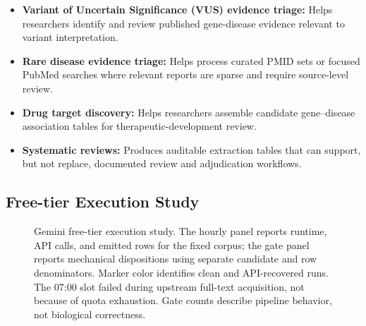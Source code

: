 \begin{itemize}[itemsep=2pt]
    \item \textbf{Variant of Uncertain Significance (VUS) evidence triage:} Helps researchers identify and review published gene-disease evidence relevant to variant interpretation.
    \item \textbf{Rare disease evidence triage:} Helps process curated PMID sets or focused PubMed searches where relevant reports are sparse and require source-level review.
    \item \textbf{Drug target discovery:} Helps researchers assemble candidate gene--disease association tables for therapeutic-development review.
    \item \textbf{Systematic reviews:} Produces auditable extraction tables that can support, but not replace, documented review and adjudication workflows.
\end{itemize}

\subsection{Free-tier Execution Study}

\DIFdelbegin
{}
\DIFdelend
\DIFaddbegin
{}
\DIFaddend



\begin{figure}[!ht]
\centering
\begin{minipage}[t]{0.61\textwidth}
\centering
\resizebox{\linewidth}{!}{}
\end{minipage}\hfill
\begin{minipage}[t]{0.36\textwidth}
\centering
\resizebox{\linewidth}{!}{}
\end{minipage}
\caption{Gemini free-tier execution study. The hourly panel reports runtime, API calls, and emitted rows for the fixed corpus; the gate panel reports mechanical dispositions using separate candidate and row denominators. Marker color identifies clean and API-recovered runs. The 07:00 slot failed during upstream full-text acquisition, not because of quota exhaustion. Gate counts describe pipeline behavior, not biological correctness.}
\label{fig:gemini-free-tier-operational}
\end{figure}

